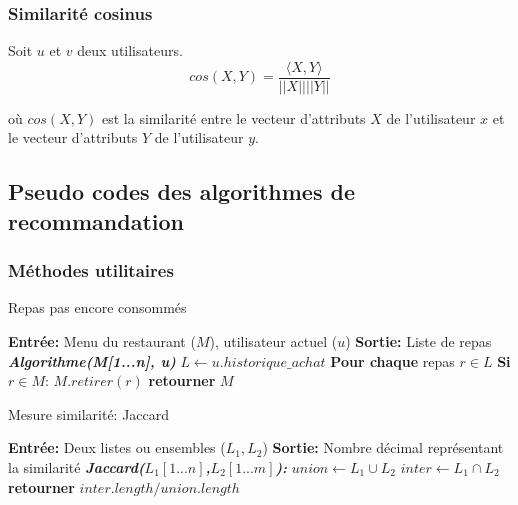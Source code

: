 \documentclass[11pt]{article}
\begin{document}
\subsubsection{Similarité cosinus}
Soit $u$ et $v$ deux utilisateurs. 
\begin{equation}
cos(X, Y) = \frac{\langle X, Y \rangle}{||X|| ||Y||}
\end{equation}

où $cos(X, Y)$ est la similarité entre le vecteur d'attributs $X$ de l'utilisateur $x$ et le vecteur d'attributs $Y$ de l'utilisateur $y$.


\newpage
\subsection{Pseudo codes des algorithmes de recommandation}
\label{annexe}
\subsubsection{Méthodes utilitaires}
\begin{algorithm}
    \caption{Repas pas encore consommés}
    \begin{algorithmic}[1]
    \Statex \textbf{Entrée:} Menu du restaurant ($M$), utilisateur actuel ($u$)
    \Statex \textbf{Sortie:} Liste de repas
    \State \textbf{\textit{Algorithme(M[1...n], u)}}
    \State \hspace{0.5cm} $L \leftarrow u.historique\_achat$
    \State \hspace{0.5cm} \textbf{Pour chaque} repas $r \in L$
    \State \hspace{1cm} \textbf{Si} $r \in M$:
    \State \hspace{1.5cm} $M.retirer(r)$
    \State \hspace{0.5cm} \textbf{retourner} $M$
    \end{algorithmic}
\end{algorithm}

\begin{algorithm}
    \caption{Mesure similarité: Jaccard}
    \begin{algorithmic}[1]
    \Statex \textbf{Entrée:} Deux listes ou ensembles ($L_1, L_2$)
    \Statex \textbf{Sortie:} Nombre décimal représentant la similarité
    \State \textbf{\textit{Jaccard($L_1[1...n]$,$L_2[1...m]$):}}
    \State \hspace{0.5cm} $union \leftarrow L_1 \cup L_2$
    \State \hspace{0.5cm} $inter \leftarrow L_1 \cap L_2$
    \State \hspace{0.5cm} \textbf{retourner} $inter.length/union.length$
    \end{algorithmic}
\end{algorithm}
\end{document}
